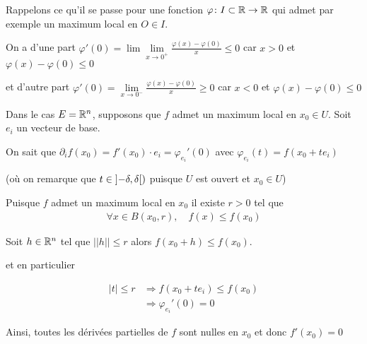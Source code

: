 \documentclass[french,a4paper,10pt]{article}
\begin{document}
	\begin{oc-proof}
		Rappelons ce qu'il se passe pour une fonction $\varphi\colon I\subset \mathbb{R}\to\mathbb{R}$ qui admet par exemple un maximum local en $O\in I$.
		
		On a d'une part $\varphi'(0)=\lim\lim\limits_{x\to0^+}\frac{\varphi(x)-\varphi(0)}x\le 0$
		car $x>0$ et $\varphi(x)-\varphi(0)\le 0$
		
		et d'autre part $\varphi'(0)=\lim\limits_{x\to0^-}\frac{\varphi(x)-\varphi(0)}x\ge 0$ car $x<0$ et $\varphi(x)-\varphi(0)\le 0$
		
		Dans le cas $E=\mathbb{R}^n$, supposons que $f$ admet un maximum local en $x_0\in U$. Soit $e_i$ un vecteur de base.
		
		On sait que $\partial_i f(x_0)=f'(x_0)\cdot e_i=\varphi_{e_i}'(0)$ avec $\varphi_{e_i}(t)=f(x_0+te_i)$
		
		(où on remarque que $t\in\mathopen{]}-\delta,\delta\mathclose{[})$ puisque $U$ est ouvert et $x_0\in U$)
		
		Puisque $f$ admet un maximum local en $x_0$ il existe $r>0$ tel que
		\[\begin{aligned}
			\forall x\in B(x_0, r),\quad f(x)\le f(x_0)
		\end{aligned}\]
	
		Soit $h\in\mathbb{R}^n$ tel que $||h||\le r$ alors $f(x_0+h)\le f(x_0)$.
		
		et en particulier
		
		\[\begin{aligned}
			|t|\le r&\Longrightarrow f(x_0+t e_i)\le f(x_0)\\
			&\Longrightarrow\varphi_{e_i}'(0)=0
		\end{aligned}\]
	
		Ainsi, toutes les dérivées partielles de $f$ sont nulles en $x_0$ et donc $f'(x_0)=0$
		
	\end{oc-proof}
\end{document}
